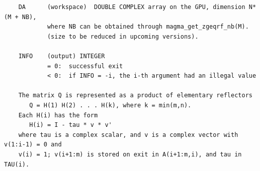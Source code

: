 \documentclass[10pt]{book}
\begin{document}
\begin{verbatim}
    DA      (workspace)  DOUBLE COMPLEX array on the GPU, dimension N*(M + NB), 
            where NB can be obtained through magma_get_zgeqrf_nb(M).
            (size to be reduced in upcoming versions).

    INFO    (output) INTEGER   
            = 0:  successful exit   
            < 0:  if INFO = -i, the i-th argument had an illegal value   
  
    The matrix Q is represented as a product of elementary reflectors   
       Q = H(1) H(2) . . . H(k), where k = min(m,n).   
    Each H(i) has the form   
       H(i) = I - tau * v * v'   
    where tau is a complex scalar, and v is a complex vector with v(1:i-1) = 0 and 
    v(i) = 1; v(i+1:m) is stored on exit in A(i+1:m,i), and tau in TAU(i).   
\end{verbatim}

\newpage
\end{document}
